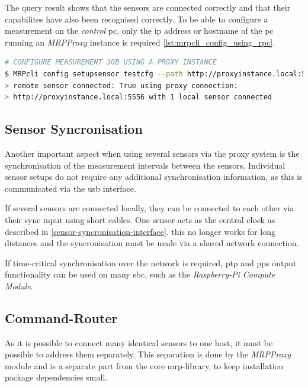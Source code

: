 The query result shows that the sensors are connected correctly and that
their capabilites have also been recognised correctly. To be able to
configure a measurement on the \emph{control} \gls{pc}, only the
\gls{ip} address or hostname of the \gls{pc} running an \emph{MRPProxy}
instance is required \ref{lst:mrpcli_config_using_rpc}.

\begin{lstlisting}[language=bash, caption={MRPcli usage example to connect with a network sensor}, label=lst:mrpcli_config_using_rpc]
# CONFIGURE MEASUREMENT JOB USING A PROXY INSTANCE
$ MRPcli config setupsensor testcfg --path http://proxyinstance.local:5556
> remote sensor connected: True using proxy connection:
> http://proxyinstance.local:5556 with 1 local sensor connected
\end{lstlisting}

\hypertarget{sensor-syncronisation}{%
\subsection{Sensor Syncronisation}\label{sensor-syncronisation}}

Another important aspect when using several sensors via the proxy system
is the synchronisation of the measurement intervals between the sensors.
Individual sensor setups do not require any additional synchronisation
information, as this is communicated via the \gls{usb} interface.

If several sensors are connected locally, they can be connected to each
other via their sync input using short cables. One sensor acts as the
central clock as described in \ref{sensor-syncronisation-interface}.
this no longer works for long distances and the syncronisation must be
made via a shared network connection.

If time-critical synchronisation over the network is required, \gls{ptp}
and \gls{pps} output functionality \cite{PTPIEEE1588} can be used on
many \gls{sbc}, such as the \emph{Raspberry-Pi Compute Module}.

\hypertarget{command-router}{%
\subsection{Command-Router}\label{command-router}}

As it is possible to connect many identical sensors to one host, it must
be possible to address them separately. This separation is done by the
\emph{MRPProxy} module and is a separate part from the core
\gls{mrp}-library, to keep installation package dependencies small.

